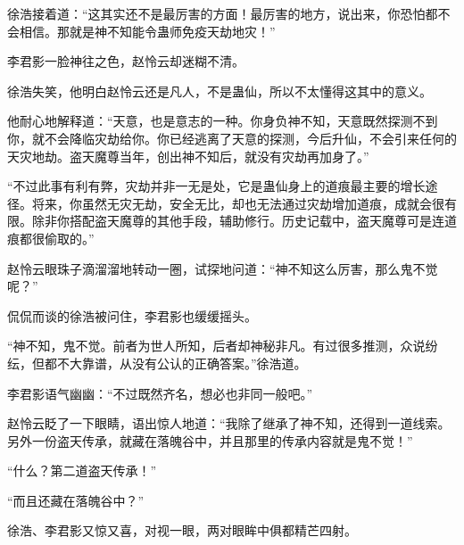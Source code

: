 \begin{this_body}
徐浩接着道：“这其实还不是最厉害的方面！最厉害的地方，说出来，你恐怕都不会相信。那就是神不知能令蛊师免疫天劫地灾！”

李君影一脸神往之色，赵怜云却迷糊不清。

徐浩失笑，他明白赵怜云还是凡人，不是蛊仙，所以不太懂得这其中的意义。

他耐心地解释道：“天意，也是意志的一种。你身负神不知，天意既然探测不到你，就不会降临灾劫给你。你已经逃离了天意的探测，今后升仙，不会引来任何的天灾地劫。盗天魔尊当年，创出神不知后，就没有灾劫再加身了。”

“不过此事有利有弊，灾劫并非一无是处，它是蛊仙身上的道痕最主要的增长途径。将来，你虽然无灾无劫，安全无比，却也无法通过灾劫增加道痕，成就会很有限。除非你搭配盗天魔尊的其他手段，辅助修行。历史记载中，盗天魔尊可是连道痕都很偷取的。”

赵怜云眼珠子滴溜溜地转动一圈，试探地问道：“神不知这么厉害，那么鬼不觉呢？”

侃侃而谈的徐浩被问住，李君影也缓缓摇头。

“神不知，鬼不觉。前者为世人所知，后者却神秘非凡。有过很多推测，众说纷纭，但都不大靠谱，从没有公认的正确答案。”徐浩道。

李君影语气幽幽：“不过既然齐名，想必也非同一般吧。”

赵怜云眨了一下眼睛，语出惊人地道：“我除了继承了神不知，还得到一道线索。另外一份盗天传承，就藏在落魄谷中，并且那里的传承内容就是鬼不觉！”

“什么？第二道盗天传承！”

“而且还藏在落魄谷中？”

徐浩、李君影又惊又喜，对视一眼，两对眼眸中俱都精芒四射。

\end{this_body}

